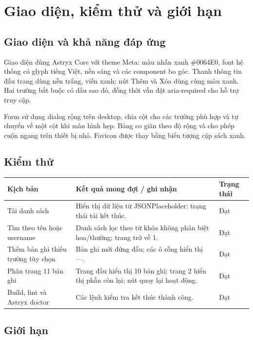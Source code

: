 \documentclass[12pt,a4paper]{article}
\newcommand{\code}[1]{\textsf{\small #1}}
\begin{document}
\section{Giao diện, kiểm thử và giới hạn}

\subsection{Giao diện và khả năng đáp ứng}

Giao diện dùng Astryx Core với theme Meta: màu nhấn xanh \#0064E0, font hệ thống có glyph tiếng Việt, nền sáng và các component bo góc. Thanh thông tin đầu trang dùng nền trắng, viền xanh; nút Thêm và Xóa dùng cùng màu xanh. Hai trường bắt buộc có dấu sao đỏ, đồng thời vẫn đặt \code{aria-required} cho hỗ trợ truy cập.

Form sử dụng dialog rộng trên desktop, chia cột cho các trường phù hợp và tự chuyển về một cột khi màn hình hẹp. Bảng co giãn theo độ rộng và cho phép cuộn ngang trên thiết bị nhỏ. Favicon được thay bằng biểu tượng cặp sách xanh.

\subsection{Kiểm thử}

\begin{tabularx}{\textwidth}{@{}L{4.2cm} Y L{2.1cm}@{}}
\toprule
\textbf{Kịch bản} & \textbf{Kết quả mong đợi / ghi nhận} & \textbf{Trạng thái} \\
\midrule
Tải danh sách & Hiển thị dữ liệu từ JSONPlaceholder; trạng thái tải kết thúc. & Đạt \\
Tìm theo tên hoặc username & Danh sách lọc theo từ khóa không phân biệt hoa/thường; trang trở về 1. & Đạt \\
Thêm bản ghi thiếu trường tùy chọn & Bản ghi mới đứng đầu; các ô rỗng hiển thị \code{—}. & Đạt \\
Phân trang 11 bản ghi & Trang đầu hiển thị 10 bản ghi; trang 2 hiển thị phần còn lại; nút quay lại hoạt động. & Đạt \\
Build, lint và Astryx doctor & Các lệnh kiểm tra kết thúc thành công. & Đạt \\
\bottomrule
\end{tabularx}

\subsection{Giới hạn}
\end{document}
